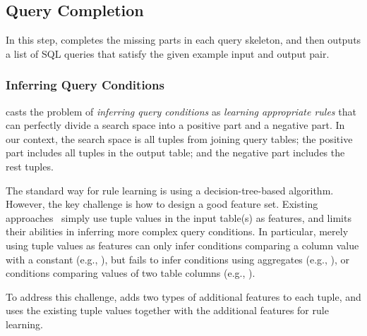 

\subsection{Query Completion}
\label{sec:completion}


In this step, \ourtool completes the missing parts
in each query skeleton, and then
outputs a list of SQL queries
that satisfy the given example input and output pair.




\subsubsection{Inferring Query Conditions}
\label{sec:condition}

\ourtool casts the problem of \textit{inferring query conditions} as
 \textit{learning appropriate rules} that can perfectly divide a search space
into a positive part and a negative part. In our context, the search space
is all tuples from joining query tables; the positive part
includes all tuples in the output table; and the negative part includes the rest
tuples.

The standard way for rule learning is using a decision-tree-based
algorithm. However, the key challenge is how to design a good feature set.
Existing approaches~\cite{Tran:2009} simply use
tuple values in the input table(s) as features, 
and limits their abilities in inferring more
complex query conditions. In particular,
merely using tuple values as features can only infer
conditions comparing a column value with a constant
(e.g., ), but
fails to infer conditions using aggregates (e.g., ),
or conditions comparing values of two table columns
(e.g., ).


To address this challenge, \ourtool adds two types of
additional features to each tuple, and uses
the existing tuple values together with the additional features
for rule learning.

